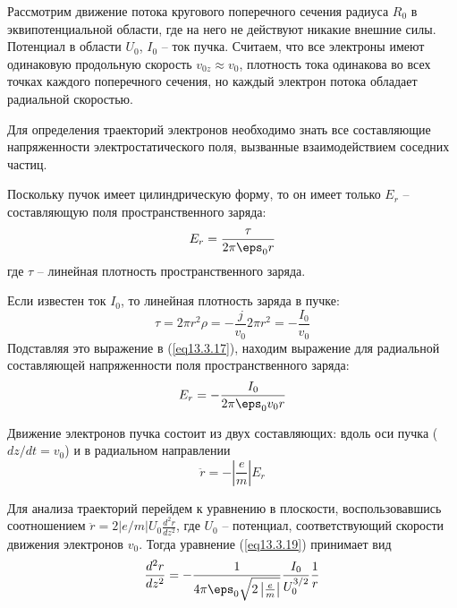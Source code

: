 
Рассмотрим движение потока кругового поперечного сечения радиуса \( R_0 \) в 
эквипотенциальной области, где на него не действуют никакие внешние силы. 
Потенциал в области \( U_0 \), \( I_0 \) -- ток пучка. Считаем, что все 
электроны имеют одинаковую продольную скорость \( v_{0z} \approx v_0 \), 
плотность тока одинакова во всех точках каждого поперечного сечения, но каждый 
электрон потока обладает радиальной скоростью.

Для определения траекторий электронов необходимо знать все составляющие 
напряженности электростатического поля, вызванные взаимодействием соседних частиц.

Поскольку пучок имеет цилиндрическую форму, то он имеет только \( E_r \) -- 
составляющую поля пространственного заряда:
\begin{equation}
	E_r = \frac{\tau}{2\pi\eps_0 r}
	\label{eq13.3.17}
\end{equation}
где \( \tau \) -- линейная плотность пространственного заряда.

Если известен ток \( I_0 \), то линейная плотность заряда в пучке:
\[
	\tau = 2\pi r^2 \rho = -\frac{j}{v_0}2\pi r^2 = -\frac{I_0}{v_0}
\]
Подставляя это выражение в (\ref{eq13.3.17}), находим выражение для радиальной 
составляющей напряженности поля пространственного заряда:
\begin{equation}
	E_r = -\frac{I_0}{2\pi\eps_0 v_0 r}
	\label{eq13.3.18}
\end{equation}
 
Движение электронов пучка состоит из двух составляющих: вдоль оси пучка 
(\( dz/dt = v_0\)) и в радиальном направлении
\begin{equation}
	\ddot{r} = -\left| \frac{e}{m} \right|E_r
	\label{eq13.3.19}
\end{equation}

Для анализа траекторий перейдем к уравнению в плоскости, воспользовавшись 
соотношением \( \ddot{r} = 2\left| e/m \right| U_0 \frac{d^2 r}{dz^2} \), где 
\( U_0 \) -- потенциал, соответствующий скорости движения электронов 
\( v_0 \). Тогда  уравнение (\ref{eq13.3.19}) принимает вид
\begin{equation}
	\frac{d^2 r}{dz^2} = 
		-\frac{1}{4\pi\eps_0 \sqrt{2\left|\frac{e}{m}\right|}}
		\frac{I_0}{U_0^{3/2}}\frac{1}{r}
	\label{eq13.3.20}
\end{equation}
 
